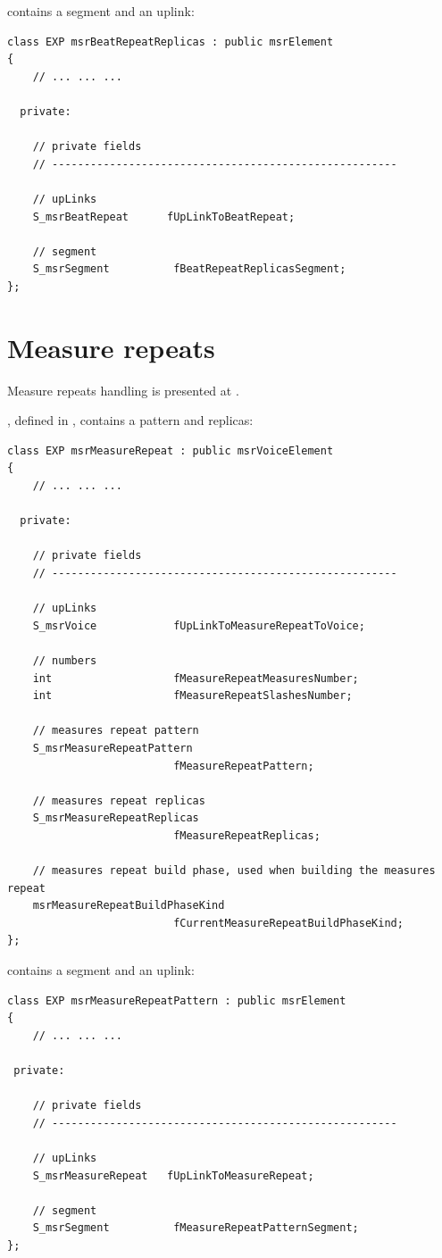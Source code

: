  contains a segment and an uplink:
\begin{lstlisting}[language=CPlusPlus]
class EXP msrBeatRepeatReplicas : public msrElement
{
	// ... ... ...

  private:

    // private fields
    // ------------------------------------------------------

    // upLinks
    S_msrBeatRepeat      fUpLinkToBeatRepeat;

    // segment
    S_msrSegment          fBeatRepeatReplicasSegment;
};
\end{lstlisting}


\section{Measure repeats}\label{Measure repeats}

Measure repeats handling is presented at .

, defined in , contains a pattern and replicas:
\begin{lstlisting}[language=CPlusPlus]
class EXP msrMeasureRepeat : public msrVoiceElement
{
	// ... ... ...

  private:

    // private fields
    // ------------------------------------------------------

    // upLinks
    S_msrVoice            fUpLinkToMeasureRepeatToVoice;

    // numbers
    int                   fMeasureRepeatMeasuresNumber;
    int                   fMeasureRepeatSlashesNumber;

    // measures repeat pattern
    S_msrMeasureRepeatPattern
                          fMeasureRepeatPattern;

    // measures repeat replicas
    S_msrMeasureRepeatReplicas
                          fMeasureRepeatReplicas;

    // measures repeat build phase, used when building the measures repeat
    msrMeasureRepeatBuildPhaseKind
                          fCurrentMeasureRepeatBuildPhaseKind;
};
\end{lstlisting}

 contains a segment and an uplink:
\begin{lstlisting}[language=CPlusPlus]
class EXP msrMeasureRepeatPattern : public msrElement
{
 	// ... ... ...

 private:

    // private fields
    // ------------------------------------------------------

    // upLinks
    S_msrMeasureRepeat   fUpLinkToMeasureRepeat;

    // segment
    S_msrSegment          fMeasureRepeatPatternSegment;
};
\end{lstlisting}

